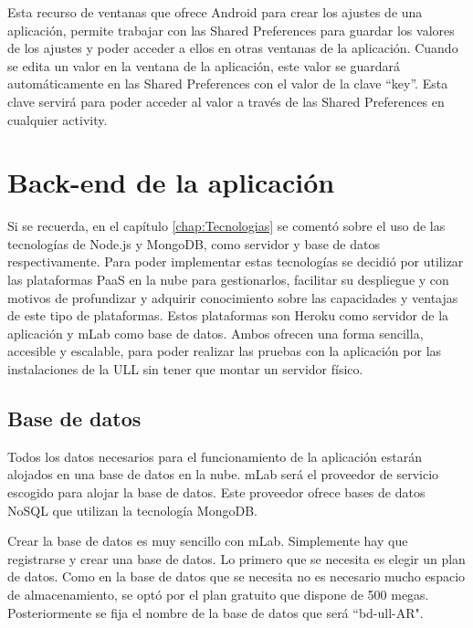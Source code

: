 Esta recurso de ventanas que ofrece Android para crear los ajustes de una aplicación, permite trabajar con las Shared Preferences para guardar los valores de los ajustes y poder acceder a ellos en otras ventanas de la aplicación. Cuando se edita un valor en la ventana de la aplicación, este valor se guardará automáticamente en las Shared Preferences con el valor de la clave ``key''. Esta clave servirá para poder acceder al valor a través de las Shared Preferences en cualquier activity.

% 


\section{Back-end de la aplicación} \label{chap:BackEnd} 

Si se recuerda, en el capítulo \ref{chap:Tecnologias} se comentó sobre el uso de las tecnologías de Node.js y MongoDB, como servidor y base de datos respectivamente. Para poder implementar estas tecnologías se decidió por utilizar las plataformas PaaS en la nube para gestionarlos, facilitar su despliegue y con motivos de profundizar y adquirir conocimiento sobre las capacidades y ventajas de este tipo de plataformas. Estos plataformas son Heroku como servidor de la aplicación y mLab como base de datos. Ambos ofrecen una forma sencilla, accesible y escalable, para poder realizar las pruebas con la aplicación por las instalaciones de la ULL sin tener que montar un servidor físico.

\subsection{Base de datos}

Todos los datos necesarios para el funcionamiento de la aplicación estarán alojados en una base de datos en la nube. mLab será el proveedor de servicio escogido para alojar la base de datos. Este proveedor ofrece bases de datos NoSQL que utilizan la tecnología MongoDB.

Crear la base de datos es muy sencillo con mLab. Simplemente hay que registrarse y crear una base de datos. Lo primero que se necesita es elegir un plan de datos. Como en la base de datos que se necesita no es necesario mucho espacio de almacenamiento, se optó por el plan gratuito que dispone de 500 megas. Posteriormente se fija el nombre de la base de datos que será ``bd-ull-AR".

